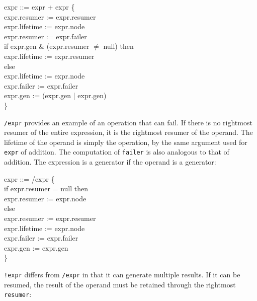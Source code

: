 \goodbreak
\begin{iconcode}
\>expr ::= expr + expr \{\\
\>\>\>\>\>expr.resumer := expr.resumer\\
\>\>\>\>\>expr.lifetime := expr.node\\
\>\>\>\>\>expr.resumer := expr.failer\\
\>\>\>\>\>if expr.gen \& (expr.resumer ${\neq}$ null) then\\
\>\>\>\>\>\>expr.lifetime := expr.resumer\\
\>\>\>\>\>else\\
\>\>\>\>\>\>expr.lifetime := expr.node\\
\>\>\>\>\>expr.failer := expr.failer\\
\>\>\>\>\>expr.gen := (expr.gen | expr.gen)\\
\>\>\>\>\>\}\\
\end{iconcode}


\texttt{/expr} provides an example of an operation that can fail. If
there is no rightmost resumer of the entire expression, it is the
rightmost resumer of the operand. The lifetime of the operand is
simply the operation, by the same argument used for
\texttt{expr} of addition. The computation of
\texttt{failer} is also analogous to that of addition. The expression
is a generator if the operand is a generator:

\goodbreak
\begin{iconcode}
\>expr ::= /expr \{\\
\>\>\>\>if expr.resumer = null then\\
\>\>\>\>\>expr.resumer := expr.node\\
\>\>\>\>else\\
\>\>\>\>\>expr.resumer := expr.resumer\\
\>\>\>\>expr.lifetime := expr.node\\
\>\>\>\>expr.failer := expr.failer\\
\>\>\>\>expr.gen := expr.gen\\
\>\>\>\>\}\\
\end{iconcode}


\texttt{!expr} differs from \texttt{/expr} in that it can generate
multiple results. If it can be resumed, the result of the operand must
be retained through the rightmost \texttt{resumer}:

